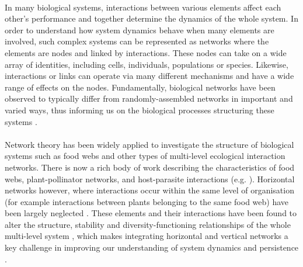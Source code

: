 \documentclass[a4,12pt]{article}
\begin{document}
    
    \paragraph{}
    In many biological systems, interactions between various elements affect each other's performance and together determine the dynamics of the whole system. In order to understand how system dynamics behave when many elements are involved, such complex systems can be represented as networks where the elements are nodes and linked by interactions. These nodes can take on a wide array of identities, including cells, individuals, populations or species. Likewise, interactions or links can operate via many different mechanisms and have a wide range of effects on the nodes. Fundamentally, biological networks have been observed to typically differ from randomly-assembled networks in important and varied ways, thus informing us on the biological processes structuring these systems \parencite{Dunne2002}.

    \paragraph{}
    Network theory has been widely applied to investigate the structure of biological systems such as food webs and other types of multi-level ecological interaction networks. There is now a rich body of work describing the characteristics of food webs, plant-pollinator networks, and host-parasite interactions (e.g. \cite{Lafferty2008, Thompson2012, Dunne2013, Stouffer2014, Cirtwill2015a}). Horizontal networks however, where interactions occur within the same level of organisation (for example interactions between plants belonging to the same food web) have been largely neglected \parencite{Ellison2019}. These elements and their interactions have been found to alter the structure, stability and diversity-functioning relationships of the whole multi-level system \parencite{Hammill2015, Giling2019, Zhao2019, Miele2019}, which makes integrating horizontal and vertical networks a key challenge in improving our understanding of system dynamics and persistence \parencite{Godoy2018c}.
\end{document}
